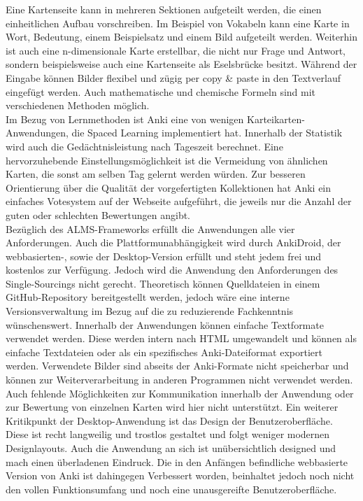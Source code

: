 \noindent Eine Kartenseite kann in mehreren Sektionen aufgeteilt werden, die einen einheitlichen Aufbau vorschreiben. Im Beispiel von Vokabeln kann eine Karte in Wort, Bedeutung, einem Beispielsatz und einem Bild aufgeteilt werden. Weiterhin ist auch eine n-dimensionale Karte erstellbar, die nicht nur Frage und Antwort, sondern beispielsweise auch eine Kartenseite als Eselsbrücke besitzt.  
Während der Eingabe können Bilder flexibel und zügig per copy {\&} paste in den Textverlauf eingefügt werden. Auch mathematische und chemische Formeln sind mit verschiedenen Methoden möglich. \\

\noindent Im Bezug von Lernmethoden ist Anki eine von wenigen Karteikarten-Anwendungen, die Spaced Learning implementiert hat. Innerhalb der Statistik wird auch die Gedächtnisleistung nach Tageszeit berechnet. Eine hervorzuhebende Einstellungsmöglichkeit ist die Vermeidung von ähnlichen Karten, die sonst am selben Tag gelernt werden würden. Zur besseren Orientierung über die Qualität der vorgefertigten Kollektionen hat Anki ein einfaches Votesystem auf der Webseite aufgeführt, die jeweils nur die Anzahl der guten oder schlechten Bewertungen angibt. \\

\noindent Bezüglich des ALMS-Frameworks erfüllt die Anwendungen alle vier Anforderungen. Auch die Plattformunabhängigkeit wird durch AnkiDroid, der webbasierten-, sowie der Desktop-Version erfüllt und steht jedem frei und kostenlos zur Verfügung. Jedoch wird die Anwendung den Anforderungen des Single-Sourcings nicht gerecht. Theoretisch können Quelldateien in einem GitHub-Repository bereitgestellt werden, jedoch wäre eine interne Versionsverwaltung im Bezug auf die zu reduzierende Fachkenntnis wünschenswert. Innerhalb der Anwendungen können einfache Textformate verwendet werden. Diese werden intern nach HTML umgewandelt und können als einfache Textdateien oder als ein spezifisches Anki-Dateiformat exportiert werden. Verwendete Bilder sind abseits der Anki-Formate nicht speicherbar und können zur Weiterverarbeitung in anderen Programmen nicht verwendet werden. \\

\noindent Auch fehlende Möglichkeiten zur Kommunikation innerhalb der Anwendung oder zur Bewertung von einzelnen Karten wird hier nicht unterstützt. Ein weiterer Kritikpunkt der Desktop-Anwendung ist das Design der Benutzeroberfläche. Diese ist recht langweilig und trostlos gestaltet und folgt weniger modernen Designlayouts. Auch die Anwendung an sich ist unübersichtlich designed und mach einen überladenen Eindruck. Die in den Anfängen befindliche webbasierte Version von Anki ist dahingegen Verbessert worden, beinhaltet jedoch noch nicht den vollen Funktionsumfang und noch eine unausgereifte Benutzeroberfläche. \\


